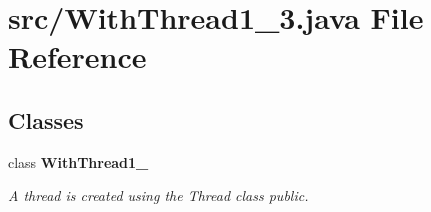 \section{src/\+With\+Thread1\+\_\+3.java File Reference}
\label{_with_thread1__3_8java}
\subsection*{Classes}
\begin{DoxyCompactItemize}
\item 
class {\bf With\+Thread1\+\_}
\begin{DoxyCompactList}\small\item\em A thread is created using the Thread class  public. \end{DoxyCompactList}\end{DoxyCompactItemize}
